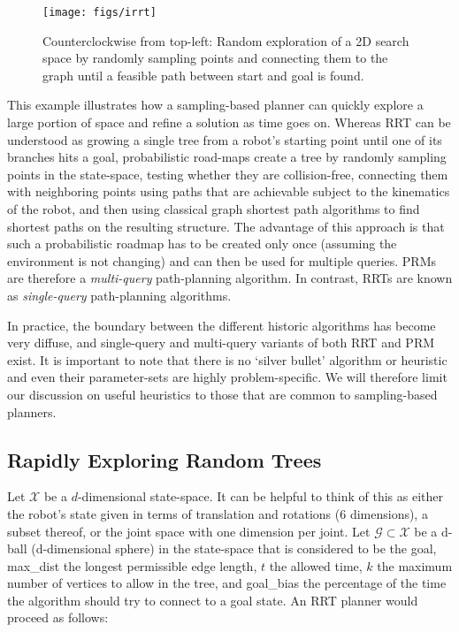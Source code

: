 \begin{figure}
    \centering
    \texttt{[image: figs/irrt]}
    \caption{Counterclockwise from top-left: Random exploration of a 2D search space by randomly sampling points and connecting them to the graph until a feasible path between start and goal is found.\label{fig:rrt}}
\end{figure}

This example illustrates how a sampling-based planner can quickly explore a large portion of space and refine a solution as time goes on. Whereas RRT can be understood as growing a single tree from a robot's starting point until one of its branches hits a goal, probabilistic road-maps create a tree by randomly sampling points in the state-space, testing whether they are collision-free, connecting them with neighboring points using paths that are achievable subject to the kinematics of the robot, and then using classical graph shortest path algorithms to find shortest paths on the resulting structure. The advantage of this approach is that such a probabilistic roadmap has to be created only once (assuming the environment is not changing) and can then be used for multiple queries. PRMs are therefore a \textsl{multi-query} path-planning algorithm. In contrast, RRTs are known as \textsl{single-query} path-planning algorithms.

In practice, the boundary between the different historic algorithms has become very diffuse, and single-query and multi-query variants of both RRT and PRM exist. It is important to note that there is no `silver bullet' algorithm or heuristic and even their parameter-sets are highly problem-specific. We will therefore limit our discussion on useful heuristics to those that are common to sampling-based planners.

\subsection{Rapidly Exploring Random Trees}
Let $ \mathcal{X}$ be a $ d$-dimensional state-space. It can be helpful to think of this as either the robot's state given in terms of translation and rotations (6 dimensions), a subset thereof, or the joint space with one dimension per joint. Let $ \mathcal{G} \subset \mathcal{X}$ be a  d-ball (d-dimensional sphere) in the state-space that is considered to be the goal, max\_dist the longest permissible edge length, $t$ the allowed time, $k$ the maximum number of vertices to allow in the tree, and goal\_bias the percentage of the time the algorithm should try to connect to a goal state. An RRT planner would proceed as follows:


